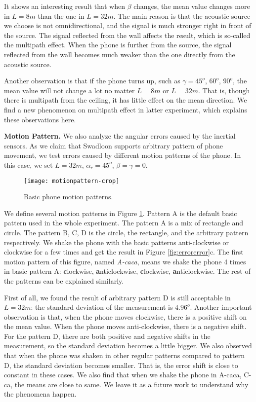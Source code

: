 \documentclass[]{sig-alternate-10pt}
\def \ourprotocol{Swadloon\xspace}
\begin{document}
It shows an interesting result that when $\beta$
 changes, the mean value changes more in $L=8m$ than the one
 in $L=32m$. The main reason is that the acoustic source we
 choose is not omnidirectional, and the signal is much stronger right
 in front of the source.
The signal reflected from the wall affects the result, which is
 so-called the multipath effect.
When the phone is further from the source, the signal reflected
 from the wall becomes much weaker than the one directly from the acoustic source.

Another observation is that if the phone turns up, such as
 $\gamma=45^o$, $60^o$, $90^o $, the mean value will not
 change a lot no matter $L=8m$ or $L=32m$. That is, though there is
 multipath from the ceiling, it has little effect on the mean
 direction.
We find a new phenomenon on multipath effect in latter
experiment, which  explains these observations here.


\noindent\textbf{Motion Pattern.} We also analyze the angular errors
caused by the inertial sensors.
As we claim that \ourprotocol supports arbitrary pattern of phone
movement, we test errors caused by different motion patterns of the
phone. In this case, we set $L=32m$, $\alpha_r=45^o$,
$\beta=\gamma=0$.

\begin{figure}[h]
\begin{centering}
        \texttt{[image: motionpattern-crop]}
\par\end{centering}
\caption{Basic phone motion patterns.}
    \label{fig:motionpattern}
\end{figure}

We define several motion patterns in Figure \ref{fig:motionpattern}.
Pattern A is the default basic pattern used in the whole experiment.
The pattern A is a mix of rectangle and circle. The pattern
B, C, D is the circle, the rectangle, and the arbitrary
pattern respectively. We shake the phone with the basic patterns
anti-clockwise or 
clockwise for a few times and get the result in Figure
\ref{fig:errorerror}c. The first motion pattern of this figure,
named \emph{A-caca}, means we shake the phone 4 times in basic pattern
A: \textbf{c}lockwise, \textbf{a}nticlockwise, \textbf{c}lockwise,
\textbf{a}nticlockwise. The rest of the patterns can be explained
similarly.


First of all, we found the result of arbitrary pattern D is still
 acceptable in $L=32m$: the standard deviation of the
 measurement is $4.96^o$.
Another important observation is that, when the phone moves clockwise,
there is a positive shift on the mean value. 
When the phone moves anti-clockwise, there is a negative shift. 
For the pattern D, there are both positive and negative shifts in the
 measurement, so the standard deviation becomes a little bigger.
We also observed that when the phone was shaken in other regular
 patterns compared to pattern D, the standard deviation
 becomes smaller.
That is, the error shift is close
 to constant in these cases.
We also find that when we shake the phone in A-caca, C-ca, the
means are close to same.
We leave it as a future work to understand why the phenomena happen.
\end{document}
